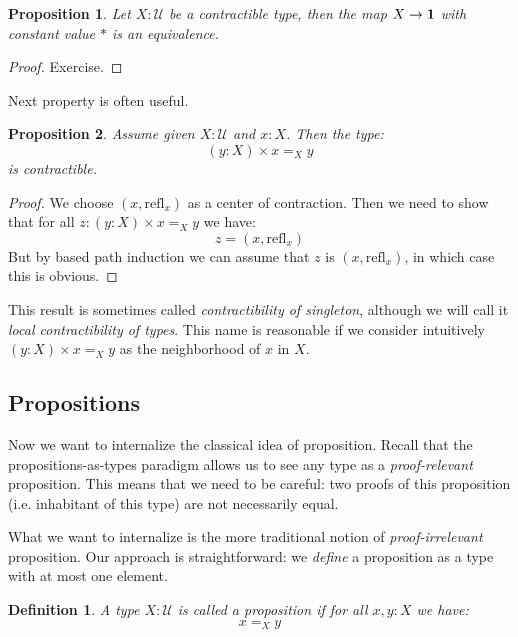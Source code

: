 \documentclass{article}
\newcommand{\sse}[1]{\medbreak \subsection{#1}}
\newcommand{\U}{{\mathcal U}}
\renewcommand{\r}{\rightarrow}
\newcommand{\refl}{\mathrm{refl}}
\newcommand{\one}{{\bf 1}}
\newcommand{\Prop}{\mathrm{Prop}}
\newtheorem{definition}{Definition}
\newtheorem{proposition}{Proposition}
\newtheorem{remark}{Remark}
\begin{document}
\begin{proposition}
Let $X:\U$ be a contractible type, then the map $X\r \one$ with constant value $*$ is an equivalence.
\end{proposition}
\begin{proof}
Exercise.
\end{proof}

Next property is often useful.

\begin{proposition}
Assume given $X:\U$ and $x:X$. Then the type: 
\[(y:X)\times x=_X y\]
is contractible.%
\end{proposition}
\begin{proof}
We choose $(x,\refl_x)$ as a center of contraction. Then we need to show that for all $z:(y:X)\times x=_X y$ we have: 
\[z=(x,\refl_x)\]
But by based path induction we can assume that $z$ is $(x,\refl_x)$, in which case this is obvious.
\end{proof}

This result is sometimes called \emph{contractibility of singleton}, although we will call it \emph{local contractibility of types}. This name is reasonable if we consider intuitively $(y:X)\times x=_X y$  as the neighborhood of $x$ in $X$. %



\sse{Propositions}

Now we want to internalize the classical idea of proposition. Recall that the propositions-as-types paradigm allows us to see any type as a \emph{proof-relevant} proposition. This means that we need to be careful: two proofs of this proposition (i.e. inhabitant of this type) are not necessarily equal. 

What we want to internalize is the more traditional notion of \emph{proof-irrelevant} proposition. Our approach is straightforward: we \emph{define} a proposition as a type with at most one element.

\begin{definition}
A type $X:\U$ is called a proposition if for all $x,y:X$ we have: 
\[x=_X y\]

\end{definition}
\end{document}
